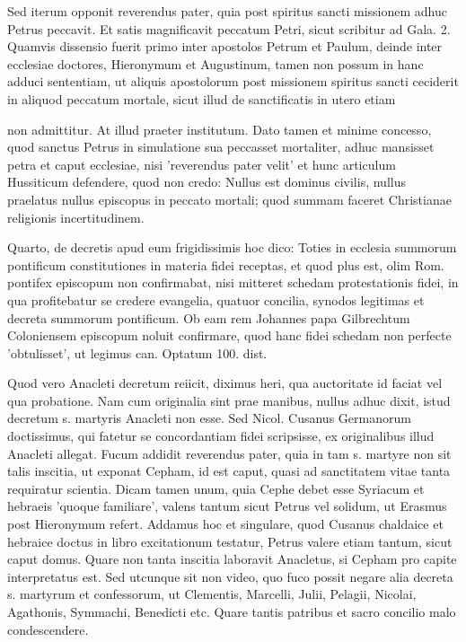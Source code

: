 Sed iterum opponit reverendus pater, quia post spiritus sancti missionem adhuc Petrus peccavit. Et satis magnificavit peccatum Petri, sicut scribitur ad Gala. 2. Quamvis dissensio fuerit primo inter apostolos Petrum et Paulum, deinde inter ecclesiae doctores, Hieronymum et Augustinum, tamen non possum in hanc adduci sententiam, ut aliquis apostolorum post missionem spiritus sancti ceciderit in aliquod peccatum mortale, sicut illud de sanctificatis in \marginpar{\small[294]} utero etiam

non admittitur. At illud praeter institutum. Dato tamen et minime concesso, quod sanctus Petrus in simulatione sua peccasset mortaliter, adhuc mansisset petra et caput ecclesiae, nisi 'reverendus pater velit' et hunc articulum Hussiticum defendere, quod non credo: Nullus est dominus civilis, nullus praelatus nullus episcopus in peccato mortali; quod summam faceret Christianae religionis incertitudinem.

Quarto, de decretis apud eum frigidissimis hoc dico: Toties in ecclesia summorum pontificum constitutiones in materia fidei receptas, et quod plus est, olim Rom. pontifex episcopum non confirmabat, nisi mitteret schedam protestationis fidei, in qua profitebatur se credere evangelia, quatuor concilia, synodos legitimas et decreta summorum pontificum. Ob eam rem Johannes papa Gilbrechtum Coloniensem episcopum noluit confirmare, quod hanc fidei schedam non perfecte 'obtulisset', ut legimus can. Optatum 100. dist.

Quod vero Anacleti decretum reiicit, diximus heri, qua auctoritate id faciat vel qua probatione. Nam cum originalia sint prae manibus, nullus adhuc dixit, istud decretum s. martyris Anacleti non esse. Sed Nicol. Cusanus Germanorum doctissimus, qui fatetur se concordantiam fidei scripsisse, ex originalibus illud Anacleti allegat. Fucum addidit reverendus pater, quia in tam s. martyre non sit talis inscitia, ut exponat Cepham, id est caput, quasi ad sanctitatem vitae tanta requiratur scientia. Dicam tamen unum, quia Cephe debet esse Syriacum et hebraeis 'quoque familiare', valens tantum sicut Petrus vel solidum, ut Erasmus post Hieronymum refert. Addamus hoc et singulare, quod Cusanus chaldaice et hebraice doctus in libro excitationum testatur, Petrus valere etiam tantum, sicut caput domus. Quare non tanta inscitia laboravit Anacletus, si Cepham pro capite interpretatus est. Sed utcunque sit non video, quo fuco possit negare alia decreta s. martyrum et confessorum, ut Clementis, Marcelli, Julii, Pelagii, Nicolai, Agathonis, Symmachi, Benedicti etc. Quare tantis patribus et sacro concilio malo condescendere.

